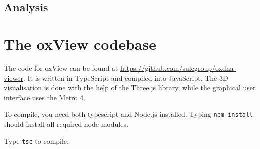 \section{Analysis}

\chapter{The oxView codebase}

The code for oxView can be found at \url{https://github.com/sulcgroup/oxdna-viewer}. It is written in TypeScript and compiled into JavaScript. The 3D visualisation is done with the help of the Three.js library, while the graphical user interface uses the Metro 4. 

To compile, you need both typescript and Node.js installed. Typing \verb|npm install| should install all required node modules.

Type \verb|tsc| to compile. 

\minitoc

